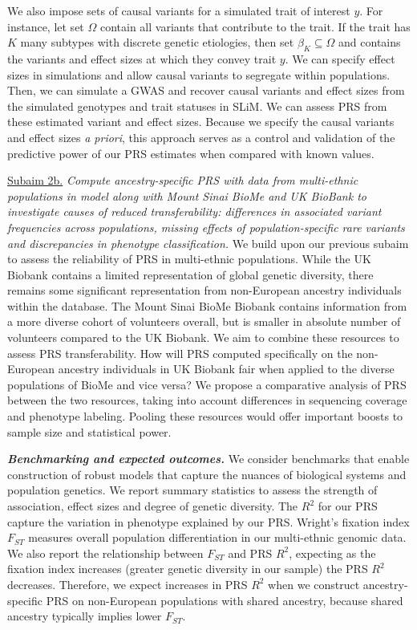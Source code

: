 \documentclass[11pt]{article}  %
\newlength\tindent
\renewcommand{\indent}{\hspace*{\tindent}}
\begin{document}
\hspace{10mm} We also impose sets of causal variants for a simulated trait of interest $y$. For instance, let set $\Omega$ contain all variants that contribute to the trait. If the trait has $K$ many subtypes with discrete genetic etiologies, then set $\beta_K \subseteq \Omega$ and contains the variants and effect sizes at which they convey trait $y$. We can specify effect sizes in simulations and allow causal variants to segregate within populations. Then, we can simulate a GWAS and recover causal variants and effect sizes from the simulated genotypes and trait statuses in SLiM. We can assess PRS from these estimated variant and effect sizes. Because we specify the causal variants and effect sizes \textit{a priori}, this approach serves as a control and validation of the predictive power of our PRS estimates when compared with known values. 

\indent \underline{Subaim 2b.} \textit{Compute ancestry-specific PRS with data from multi-ethnic populations in model along with Mount Sinai BioMe and UK BioBank to investigate causes of reduced transferability: differences in associated variant frequencies across populations, missing effects of population-specific rare variants and discrepancies in phenotype classification.} We build upon our previous subaim to assess the reliability of PRS in multi-ethnic populations. While the UK Biobank contains a limited representation of global genetic diversity, there remains some significant representation from non-European ancestry individuals within the database. The Mount Sinai BioMe Biobank contains information from a more diverse cohort of volunteers overall, but is smaller in absolute number of volunteers compared to the UK Biobank. We aim to combine these resources to assess PRS transferability. How will PRS computed specifically on the non-European ancestry individuals in UK Biobank fair when applied to the diverse populations of BioMe and vice versa? We propose a comparative analysis of PRS between the two resources, taking into account differences in sequencing coverage and phenotype labeling. Pooling these resources would offer important boosts to sample size and statistical power. 

\indent \textbf{\textit{Benchmarking and expected outcomes.}} We consider benchmarks that enable construction of robust models that capture the nuances of biological systems and population genetics. We report summary statistics to assess the strength of association, effect sizes and degree of genetic diversity. The $R^2$ for our PRS capture the variation in phenotype explained by our PRS. Wright's fixation index $F_{ST}$ \cite{wright_differential_1945} measures overall population differentiation in our multi-ethnic genomic data. We also report the relationship between $F_{ST}$ and PRS $R^2$, expecting as the fixation index increases (greater genetic diversity in our sample) the PRS $R^2$ decreases. Therefore, we expect increases in PRS $R^2$ when we construct ancestry-specific PRS on non-European populations with shared ancestry, because shared ancestry typically implies lower $F_{ST}$.         
\end{document}
